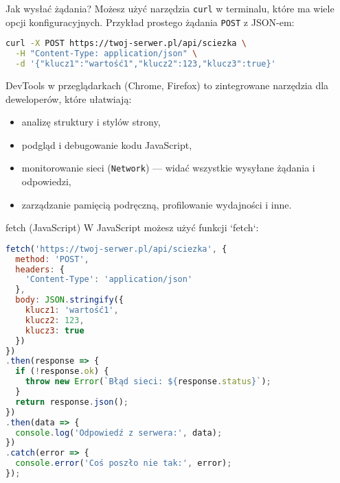 \documentclass[10pt,compress,usenames,dvipsnames,aspectratio=169]{beamer}
\begin{document}
\begin{frame}[fragile]{Jak wysłać żądania?}
  Możesz użyć narzędzia \texttt{curl} w terminalu, które ma wiele opcji konfiguracyjnych. Przykład prostego żądania \texttt{POST} z JSON-em:
    \vspace{1ex}

  \begin{lstlisting}[style=dark, language=bash, basicstyle=\ttfamily\scriptsize\color{fgcode}, numbers=none, xleftmargin=1em, xrightmargin=1em]
curl -X POST https://twoj-serwer.pl/api/sciezka \
  -H "Content-Type: application/json" \
  -d '{"klucz1":"wartość1","klucz2":123,"klucz3":true}'
  \end{lstlisting}
    \vspace{1ex}

  DevTools w przeglądarkach (Chrome, Firefox) to zintegrowane narzędzia dla deweloperów, które ułatwiają:
  \begin{itemize}
    \item analizę struktury i stylów strony,
    \item podgląd i debugowanie kodu JavaScript,
    \item monitorowanie sieci (\texttt{Network}) — widać wszystkie wysyłane żądania i odpowiedzi,
    \item zarządzanie pamięcią podręczną, profilowanie wydajności i inne.
  \end{itemize}
\end{frame}


\begin{frame}[fragile]{fetch (JavaScript)}
W JavaScript możesz użyć funkcji `fetch`:

  \begin{lstlisting}[style=dark, language=JavaScript, basicstyle=\ttfamily\scriptsize\color{fgcode}, numbers=none, xleftmargin=1em, xrightmargin=1em]
fetch('https://twoj-serwer.pl/api/sciezka', {
  method: 'POST',
  headers: {
    'Content-Type': 'application/json'
  },
  body: JSON.stringify({
    klucz1: 'wartość1',
    klucz2: 123,
    klucz3: true
  })
})
.then(response => {
  if (!response.ok) {
    throw new Error(`Błąd sieci: ${response.status}`);
  }
  return response.json();
})
.then(data => {
  console.log('Odpowiedź z serwera:', data);
})
.catch(error => {
  console.error('Coś poszło nie tak:', error);
});
  \end{lstlisting}
  
\end{frame}
\end{document}
